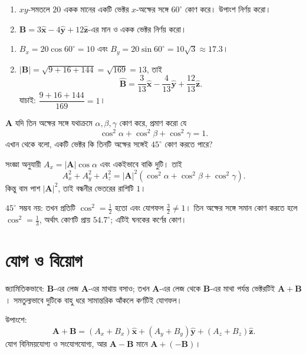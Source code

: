 \documentclass[11pt]{article}
\begin{document}
 \begin{enumerate}
  \item $xy$-সমতলে $20$ একক মানের একটি ভেক্টর $x$-অক্ষের সঙ্গে $60^{\circ}$
        কোণ করে। উপাংশ নির্ণয় করো।
  \item $\mathbf{B} = 3\hat{\mathbf{x}} - 4\hat{\mathbf{y}}
        + 12\hat{\mathbf{z}}$-এর মান ও একক ভেক্টর নির্ণয় করো।
\end{enumerate}

\begin{sol}
\begin{enumerate}
  \item $B_{x} = 20\cos 60^{\circ} = 10$ এবং
        $B_{y} = 20\sin 60^{\circ} = 10\sqrt{3} \approx 17.3$।
  \item $|\mathbf{B}| = \sqrt{9+16+144} = \sqrt{169} = 13$, তাই
        \[
          \hat{\mathbf{B}} = \frac{3}{13}\hat{\mathbf{x}}
          - \frac{4}{13}\hat{\mathbf{y}} + \frac{12}{13}\hat{\mathbf{z}} .
        \]
        যাচাই: $\dfrac{9+16+144}{169} = 1$।
\end{enumerate}
\end{sol}

 $\mathbf{A}$ যদি তিন অক্ষের সঙ্গে যথাক্রমে $\alpha, \beta, \gamma$
কোণ করে, প্রমাণ করো যে
\[
  \cos^{2}\alpha + \cos^{2}\beta + \cos^{2}\gamma = 1 .
\]
এখান থেকে বলো, একটি ভেক্টর কি তিনটি অক্ষের সঙ্গেই $45^{\circ}$ কোণ করতে পারে?

\begin{sol}
সংজ্ঞা অনুযায়ী $A_{x} = |\mathbf{A}|\cos\alpha$ এবং একইভাবে বাকি দুটি। তাই
\[
  A_{x}^{2}+A_{y}^{2}+A_{z}^{2}
  = |\mathbf{A}|^{2}\left( \cos^{2}\alpha + \cos^{2}\beta
  + \cos^{2}\gamma \right) .
\]
কিন্তু বাম পাশ $|\mathbf{A}|^{2}$, তাই বন্ধনীর ভেতরের রাশিটি $1$।

$45^{\circ}$ সম্ভব নয়: তখন প্রতিটি $\cos^{2} = \tfrac{1}{2}$ হতো এবং যোগফল
$\tfrac{3}{2} \neq 1$। তিন অক্ষের সঙ্গে সমান কোণ করতে হলে
$\cos^{2} = \tfrac{1}{3}$, অর্থাৎ কোণটি প্রায় $54.7^{\circ}$; এটিই ঘনকের
কর্ণের কোণ।
\end{sol}

\newpage

\section{যোগ ও বিয়োগ}

\begin{idea}[যোগের দুই রূপ]
জ্যামিতিকভাবে: $\mathbf{B}$-এর লেজ $\mathbf{A}$-এর মাথায় বসাও; তখন
$\mathbf{A}$-এর লেজ থেকে $\mathbf{B}$-এর মাথা পর্যন্ত ভেক্টরটিই
$\mathbf{A}+\mathbf{B}$। সমতুল্যভাবে দুটিকে বাহু ধরে সামান্তরিক আঁকলে কর্ণটিই
যোগফল।

উপাংশে:
\[
  \mathbf{A}+\mathbf{B} = \left( A_{x}+B_{x} \right)\hat{\mathbf{x}}
  + \left( A_{y}+B_{y} \right)\hat{\mathbf{y}}
  + \left( A_{z}+B_{z} \right)\hat{\mathbf{z}} .
\]
যোগ বিনিময়যোগ্য ও সংযোগযোগ্য, আর $\mathbf{A}-\mathbf{B}$ মানে
$\mathbf{A}+(-\mathbf{B})$।
\end{idea}
\end{document}
